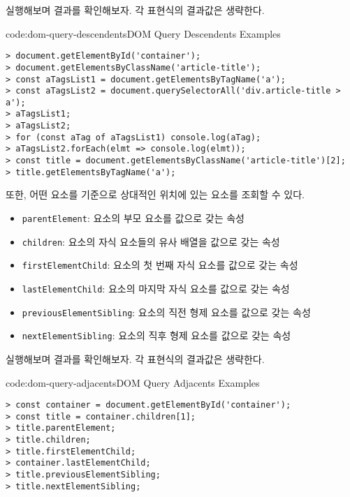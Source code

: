 \를 실행해보며 결과를 확인해보자. 각 표현식의 결과값은 생략한다.
\newpage

\begin{codeenv}{code:dom-query-descendents}{DOM Query Descendents Examples}\begin{verbatim}
> document.getElementById('container');
> document.getElementsByClassName('article-title');
> const aTagsList1 = document.getElementsByTagName('a');
> const aTagsList2 = document.querySelectorAll('div.article-title > a');
> aTagsList1;
> aTagsList2;
> for (const aTag of aTagsList1) console.log(aTag);
> aTagsList2.forEach(elmt => console.log(elmt));
> const title = document.getElementsByClassName('article-title')[2];
> title.getElementsByTagName('a');
\end{verbatim}
\end{codeenv}

또한, 어떤 요소를 기준으로 상대적인 위치에 있는 요소를 조회할 수 있다.

\begin{itemize}
    \item \texttt{parentElement}: 요소의 부모 요소를 값으로 갖는 속성
    \item \texttt{children}: 요소의 자식 요소들의 유사 배열을 값으로 갖는 속성
    \item \texttt{firstElementChild}: 요소의 첫 번째 자식 요소를 값으로 갖는 속성
    \item \texttt{lastElementChild}: 요소의 마지막 자식 요소를 값으로 갖는 속성
    \item \texttt{previousElementSibling}: 요소의 직전 형제 요소를 값으로 갖는 속성
    \item \texttt{nextElementSibling}: 요소의 직후 형제 요소를 값으로 갖는 속성
\end{itemize}

\를 실행해보며 결과를 확인해보자. 각 표현식의 결과값은 생략한다.

\begin{codeenv}{code:dom-query-adjacents}{DOM Query Adjacents Examples}\begin{verbatim}
> const container = document.getElementById('container');
> const title = container.children[1];
> title.parentElement;
> title.children;
> title.firstElementChild;
> container.lastElementChild;
> title.previousElementSibling;
> title.nextElementSibling;
\end{verbatim}
\end{codeenv}

